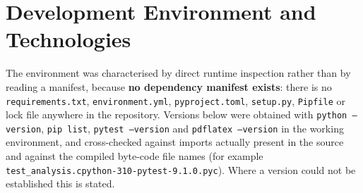 \documentclass[11pt,a4paper]{article}
\newcommand{\code}[1]{\texttt{#1}}
\begin{document}
\section{Development Environment and Technologies}
\label{sec:env}
The environment was characterised by direct runtime inspection rather than by reading a manifest, because \textbf{no dependency manifest exists}: there is no \code{requirements.txt}, \code{environment.yml}, \code{pyproject.toml}, \code{setup.py}, \code{Pipfile} or lock file anywhere in the repository. Versions below were obtained with \code{python --version}, \code{pip list}, \code{pytest --version} and \code{pdflatex --version} in the working environment, and cross-checked against imports actually present in the source and against the compiled byte-code file names (for example \code{test\_analysis.cpython-310-pytest-9.1.0.pyc}). Where a version could not be established this is stated.
\end{document}
